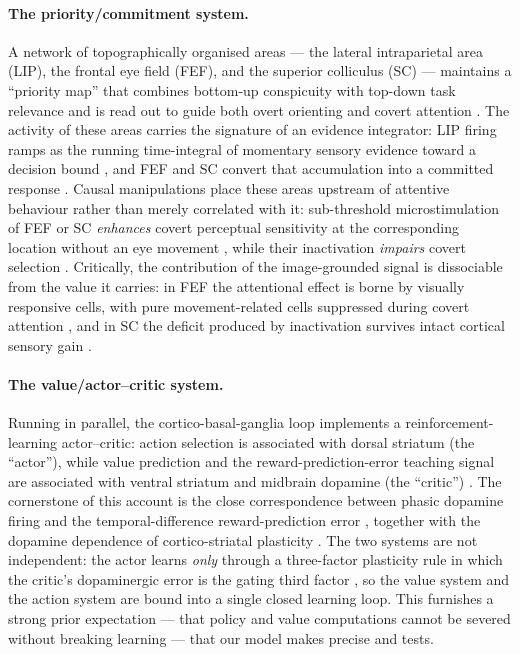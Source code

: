 \paragraph{The priority/commitment system.}
A network of topographically organised areas --- the lateral intraparietal area
(LIP), the frontal eye field (FEF), and the superior colliculus (SC) --- maintains
a ``priority map'' that combines bottom-up conspicuity with top-down task relevance
and is read out to guide both overt orienting and covert attention
\citep{bisley2010lip, fecteau2006salience, thompson2005neuronal,
veale2017how}. The activity of these areas carries the signature of an evidence
integrator: LIP firing ramps as the running time-integral of momentary sensory
evidence toward a decision bound \citep{roitman2002response, huk2005neural}, and
FEF and SC convert that accumulation into a committed response
\citep{ding2011neural, stine2023differential}. Causal manipulations place these
areas upstream of attentive behaviour rather than merely correlated with it:
sub-threshold microstimulation of FEF or SC \emph{enhances} covert perceptual
sensitivity at the corresponding location without an eye movement
\citep{moore2001control, moore2003selective, cavanaugh2006subcortical,
muller2005microstimulation}, while their inactivation \emph{impairs} covert
selection \citep{wardak2006contribution, lovejoy2010inactivation,
zenon2012attention, bollimunta2018fefsc}. Critically, the contribution of the
image-grounded signal is dissociable from the value it carries: in FEF the
attentional effect is borne by visually responsive cells, with pure
movement-related cells suppressed during covert attention
\citep{thompson2005neuronal, gregoriou2012lesions}, and in SC the deficit produced
by inactivation survives intact cortical sensory gain \citep{zenon2012attention}.

\paragraph{The value/actor--critic system.}
Running in parallel, the cortico-basal-ganglia loop implements a reinforcement-
learning actor--critic: action selection is associated with dorsal striatum (the
``actor''), while value prediction and the reward-prediction-error teaching signal
are associated with ventral striatum and midbrain dopamine (the ``critic'')
\citep{houk1995model, joel2002actor, odoherty2004dissociable, maia2009reinforcement,
collins2014opponent}. The cornerstone of this account is the close correspondence
between phasic dopamine firing and the temporal-difference reward-prediction error
\citep{schultz1997neural, hollerman1998dopamine, montague1996framework}, together
with the dopamine dependence of cortico-striatal plasticity
\citep{reynolds2002dopamine, morita2014striatal}. The two systems are not
independent: the actor learns \emph{only} through a three-factor plasticity rule in
which the critic's dopaminergic error is the gating third factor
\citep{kusmierz2017learning, gerstner2018eligibility}, so the value system and the
action system are bound into a single closed learning loop. This furnishes a strong
prior expectation --- that policy and value computations cannot be severed without
breaking learning --- that our model makes precise and tests.

